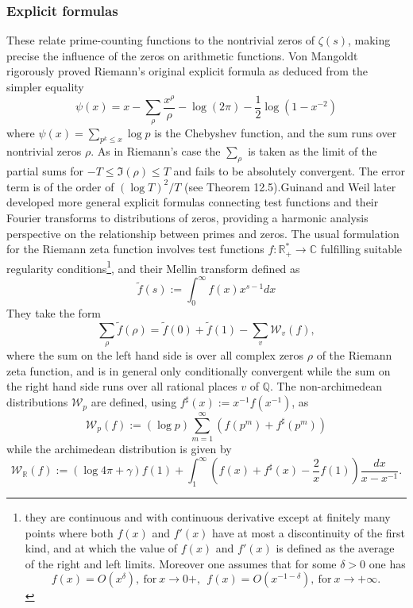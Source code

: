 \documentclass{article}
\def\C{\mathbb C}
\def\Q{{\mathbb Q}}
\def\R{{\mathbb R}}
\begin{document}
 \subsubsection{Explicit formulas} \label{sectexplicit}
 These relate prime-counting functions to the nontrivial zeros of $\zeta(s)$, making precise the influence of the zeros on arithmetic functions. Von Mangoldt \cite{vonMangoldt} rigorously proved  Riemann's original explicit formula  as deduced from the simpler equality 
    \[
    \psi(x) = x - \sum_{\rho} \frac{x^{\rho}}{\rho} - \log(2\pi) - \frac{1}{2}\log(1-x^{-2})
    \]
    where $\psi(x) = \sum_{p^k \leq x} \log p$ is the Chebyshev function, and the sum runs over nontrivial zeros $\rho$. As in Riemann's case the $\sum_{\rho}$ is taken as the limit of the partial sums for $-T\leq \Im(\rho)\leq T$ and fails to be absolutely convergent. The error term is of the order of $(\log T)^2/T$ (see \cite{MV2007} Theorem 12.5).\newline   Guinand \cite{Guinand} and Weil \cite{WeilExplicit}  later developed more general explicit formulas connecting test functions and their Fourier transforms to distributions of zeros, providing a harmonic analysis perspective on the relationship between primes and zeros. The usual formulation for the Riemann zeta function involves test functions $f:\R_+^*\to \C$ fulfilling suitable regularity conditions\footnote{they are continuous and with continuous derivative except  at finitely many points where both $f(x)$ and $f'(x)$ have at most a discontinuity of the first kind, and at which the value of $f(x)$ and $f'(x)$ is defined as the average of the right and left limits. Moreover one assumes  that for some $\delta>0$ one has 
$$
f(x)=O(x^\delta), \ \text{for} \ x\to 0+, \ \ f(x)=O(x^{-1-\delta}), \ \text{for} \ x\to +\infty.
$$  }, and their Mellin transform  defined as
\begin{equation}\label{mellin}
 \tilde f(s):=\int_0^\infty f(x)x^{s-1}dx
 \end{equation}
They take the form 
 \begin{equation}\label{bombieriexplicit}
 \sum_{\rho}\tilde f(\rho)=\tilde f(0)+\tilde f(1)-\sum_v {\mathcal W}_v(f),
 \end{equation}
 where the  sum on the left hand side is over all complex zeros $\rho$ of the Riemann zeta function, and is in general only conditionally convergent while the sum on the right hand side   runs over all rational places  $v$ of $\Q$. The non-archimedean distributions $\mathcal W_p$ are defined, using $f^\sharp(x):=x^{-1}f(x^{-1})$, as 
 \begin{equation}\label{bombieriexplicit1}
 {\mathcal W}_p(f):=(\log p)\sum_{m=1}^\infty\left(f(p^m)+f^\sharp(p^m)\right)
 \end{equation}
while the archimedean distribution is given by 
 \begin{equation}\label{bombieriexplicit2}
 {\mathcal W}_\R(f):=(\log 4\pi +\gamma)f(1)+\int_{1}^\infty\left(f(x)+f^\sharp(x)-\frac 2x f(1)\right)\frac{dx}{x-x^{-1}}.
 \end{equation}
\end{document}
